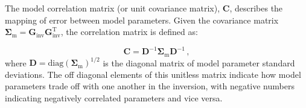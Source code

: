 The model correlation matrix (or unit covariance matrix), $\mathbf{C}$, describes the mapping of error between model parameters. Given the covariance matrix $\mathbf{\Sigma}_{\text{m}} = \mathbf{G}_{\text{inv}} \mathbf{G}_{\text{inv}}^{\text{T}}$, the correlation matrix is defined as:

\begin{equation}
\mathbf{C} = \mathbf{D}^{-1}\mathbf{\Sigma}_{\text{m}}\mathbf{D}^{-1} \,,
\end{equation}
where $\mathbf{D} = \text{diag}(\mathbf{\Sigma}_{\text{m}})^{1/2}$ is the diagonal matrix of model parameter standard deviations. The off diagonal elements of this unitless matrix indicate how model parameters trade off with one another in the inversion, with negative numbers indicating negatively correlated parameters and vice versa.







